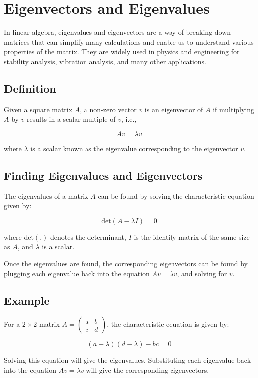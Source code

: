 \chapter{Eigenvectors and Eigenvalues}

In linear algebra, eigenvalues and eigenvectors are a way of breaking down matrices that can simplify many calculations and enable us to understand various properties of the matrix. They are widely used in physics and engineering for stability analysis, vibration analysis, and many other applications.

\section{Definition}

Given a square matrix $A$, a non-zero vector $v$ is an eigenvector of $A$ if multiplying $A$ by $v$ results in a scalar multiple of $v$, i.e.,

\begin{equation}
Av = \lambda v
\end{equation}

where $\lambda$ is a scalar known as the eigenvalue corresponding to the eigenvector $v$.

\section{Finding Eigenvalues and Eigenvectors}

The eigenvalues of a matrix $A$ can be found by solving the characteristic equation given by:

\begin{equation}
\text{det}(A - \lambda I) = 0
\end{equation}

where $\text{det}(.)$ denotes the determinant, $I$ is the identity matrix of the same size as $A$, and $\lambda$ is a scalar.

Once the eigenvalues are found, the corresponding eigenvectors can be found by plugging each eigenvalue back into the equation $Av = \lambda v$, and solving for $v$.

\section{Example}

For a $2 \times 2$ matrix $A = \begin{pmatrix} a & b \\ c & d \end{pmatrix}$, the characteristic equation is given by:

\begin{equation}
(a - \lambda)(d - \lambda) - bc = 0
\end{equation}

Solving this equation will give the eigenvalues. Substituting each eigenvalue back into the equation $Av = \lambda v$ will give the corresponding eigenvectors.

\
